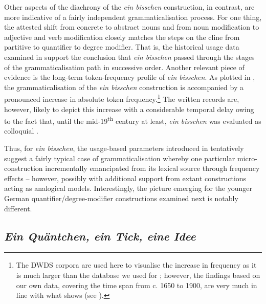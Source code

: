 \documentclass[output=paper]{langsci/langscibook}
\begin{document}
Other aspects of the diachrony of the \textit{ein bisschen} construction, in contrast, are more indicative of a fairly independent grammaticalisation process. For one thing, the attested shift from concrete to abstract nouns and from noun modification to adjective and verb modification closely matches the steps on the cline from partitive to quantifier to degree modifier. That is, the historical usage data examined in {\citet[][]{NeelsReductionexpansionbit2018}} support the conclusion that \textit{ein bisschen} passed through the stages of the grammaticalisation path in successive order. Another relevant piece of evidence is the long-term token-frequency profile of \textit{ein bisschen}. As plotted in , the grammaticalisation of the \textit{ein bisschen} construction is accompanied by a pronounced increase in absolute token frequency.\footnote{The DWDS corpora are used here to visualise the increase in frequency as it is much larger than the database we used for {\citet[][]{NeelsReductionexpansionbit2018}}; however, the findings based on our own data, covering the time span from c. 1650 to 1900, are very much in line with what  shows (see \citealt[148]{NeelsReductionexpansionbit2018}).}  The written records are, however, likely to depict this increase with a considerable temporal delay owing to the fact that, until the mid-19\textsuperscript{th} century at least, \textit{ein bisschen} was evaluated as colloquial \citep[see][6]{Tiefenbachchenundlein1987}. 

\begin{sloppypar}
Thus, for \textit{ein bisschen}, the usage-based parameters introduced in  tentatively suggest a fairly typical case of grammaticalisation whereby one particular micro-construction incrementally emancipated from its lexical source through frequency effects – however, possibly with additional support from extant constructions acting as analogical models. 
Interestingly, the picture emerging for the younger German quantifier\slash degree\hyp{}modifier constructions examined next is notably different. 
\end{sloppypar}

\subsection{\textit{Ein Quäntchen, ein Tick, eine Idee}} \label{sec3-4}
\end{document}
